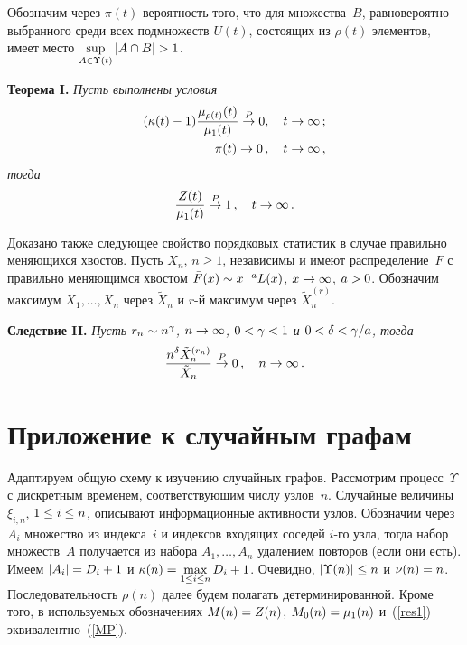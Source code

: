 \begin{multicols}{2}
    Обозначим через $\pi(t)$ вероятность того, что для
    множества~$B$, равновероятно выбранного среди всех подмножеств $U(t)$,
    состоящих из $\rho(t)$ элементов,
    имеет место $\sup\limits_{A\in\Upsilon(t)}|A\cap B|\hm>1$.

\smallskip

\noindent
\textbf{Теорема I.} \textit{Пусть выполнены условия
    \begin{align}
    \label{us1}
    (\kappa(t)-1)\displaystyle\frac{\displaystyle \mu_{\rho(t)}(t)\mathstrut}{\displaystyle \mu_1(t)\mathstrut}\stackrel{P}{\to} 0,\quad t\to\infty\,;
\\
\label{us2}
    \pi(t)\to 0\,,\quad t\to\infty\,,
    \end{align}
    тогда
    \begin{equation}
    \label{res1}
    \displaystyle\frac{\displaystyle Z(t)\mathstrut}{\displaystyle \mu_1(t)\mathstrut}\stackrel{P}{\to} 1\,,\quad t\to\infty\,.
    \end{equation}
    }

    Доказано также следующее свойство порядковых статистик
    в случае правильно меняющихся хвостов.
    Пусть $X_n$, $n\ge 1$, независимы и имеют распределение~$F$
    с правильно меняющимся хвос\-том ${\bar F}(x)\hm\sim x^{-a}L(x)$,
    $x\hm\to\infty$, $a\hm>0$.
    Обозначим максимум
    $X_1,\dots, X_n$ через ${\tilde X}_n$ и $r$-й максимум через
    ${\tilde X}^{(r)}_n$.

\smallskip

\noindent
\textbf{Следствие II.}  \textit{Пусть $r_n\hm\sim n^\gamma$, $n\hm\to\infty$, $0\hm<\gamma\hm<1$ и
    $0\hm<\delta\hm<\gamma/a$, тогда
    $$
    \displaystyle\frac{\displaystyle n^\delta {\tilde X}^{(r_n)}_n\mathstrut}{\displaystyle {\tilde X}_n\mathstrut}\stackrel{P}{\to} 0\,,\quad
    n\to\infty\,.
    $$}
    
\vspace*{-12pt}

    
\section{Приложение к случайным графам}

    Адаптируем общую схему к изучению случайных графов.
    Рассмотрим процесс~$\Upsilon$ с дискретным временем, соответствующим
    числу узлов~$n$.
    Случайные величины $\xi_{i,n}$, $1\hm\le i\hm\le n$, описывают
    информационные активности узлов. Обозначим через
    $A_i$ множество из индекса~$i$ и индексов входящих соседей
    $i$-го узла, тогда набор множеств~$A$ получается из набора
    $A_1,\dots, A_n$ удалением повторов (если они есть). Имеем
    $|A_i|\hm=D_i\hm+1$ и $\kappa(n)\hm=\max\limits_{1\le i\le n}D_i\hm+1$.
    Очевидно, $|\Upsilon(n)|\hm\le n$ и $\nu(n)\hm=n$.
    Последовательность $\rho(n)$ далее будем полагать детерминированной.
    Кроме того, в используемых обозначениях $M(n)\hm=Z(n)$, $M_0(n)\hm=\mu_1(n)$ 
    и~(\ref{res1}) эквивалентно~(\ref{MP}).


\end{multicols}

